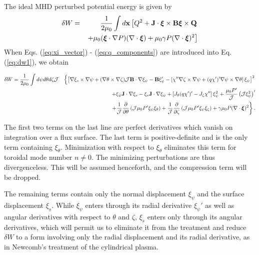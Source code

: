\documentclass[prb,twocolumn,showpacs,preprintnumbers,amsmath,amssymb]{revtex4}
\renewcommand*{\v}[1]{\hbox{\bfseries #1}}
\newcommand{\vm}[1]{\mbox{\boldmath$#1$}}
\begin{document}
The ideal MHD perturbed potential energy is given by\cite{ibb58}
\begin{eqnarray}
\delta W =&& \frac{1}{2 \mu_0} \int d\v{x} 
	\left[ Q^2 + \v{J} \cdot 
	\vm{\xi} 
	\times \v{B} \vm{\xi} 
	\times \v{Q} \right. \nonumber \\
&& \left. + \mu_0 (
	\vm{\xi} 
	\cdot \nabla P) (\nabla \cdot \vm{\xi})
	+ \mu_0 \gamma P (\nabla \cdot 
	\vm{\xi})^2 \right]
\label{eq:dw1}
\end{eqnarray}
When Eqs. (\ref{eq:xi_vector}) - (\ref{eq:q_components}) are introduced
into Eq. (\ref{eq:dw1}), we obtain
\begin{widetext}
\begin{eqnarray}
\delta W = \frac{1}{2 \mu_0} \int d\psi d\theta d\zeta  {\cal J}
	&&\left\{ 
	\left[ \nabla \xi_s \times  \nabla \psi
	+ (\nabla \theta \times \nabla \zeta) 
	{\cal J} \v{B} \cdot \nabla \xi_\psi - \v{B} \xi'_\psi
	- \left[ \chi'' \nabla \zeta \times \nabla \psi
	+ (q \chi')' \nabla \psi \times \nabla \theta \right] 
	\xi_\psi \right]^2 \right. \nonumber \\
&&+ \xi_\psi \v{J} \cdot \nabla \xi_s 
	- \xi_s \v{J} \cdot \nabla \xi_\psi
	+ \left[ J_\theta (q \chi')' - J_\zeta \chi'' \right] \xi_\psi^2
	+ \frac{\mu_0 P'}{\cal J} \left( {\cal J} \xi_\psi^2 \right)'
	\nonumber \\
&&\left. + \frac{1}{\cal J} \frac{\partial}{\partial \theta} 
	\left( {\cal J} \mu_0 P' \xi_\psi \xi_\theta \right)
	+ \frac{1}{\cal J} \frac{\partial}{\partial \zeta} 
	\left( {\cal J} \mu_0 P' \xi_\psi \xi_\zeta \right)
	+ \gamma \mu_0 P (\nabla \cdot 
	\vm{\xi})^2 \right\}.
\end{eqnarray}
\end{widetext}

The first two terms on the last line are perfect derivatives which
vanish on integration over a flux surface.  The last term is
positive-definite and is the only term containing $\xi_\theta$.
Minimization with respect to $\xi_\theta$ eliminates this term for
toroidal mode number $n \ne 0$.  The minimizing perturbations are thus
divergenceless.  This will be assumed henceforth, and the compression
term will be dropped.

The remaining terms contain only the normal displacement $\xi_\psi$ and
the surface displacement $\xi_s$.  While $\xi_\psi$ enters through its
radial derivative $\xi_\psi'$ as well as angular derivatives with
respect to $\theta$ and $\zeta$, $\xi_s$ enters only through its angular
derivatives, which will permit us to eliminate it from the treatment and
reduce $\delta W$ to a form involving only the radial displacement and
its radial derivative, as in Newcomb's treatment of the cylindrical
plasma.
\end{document}
